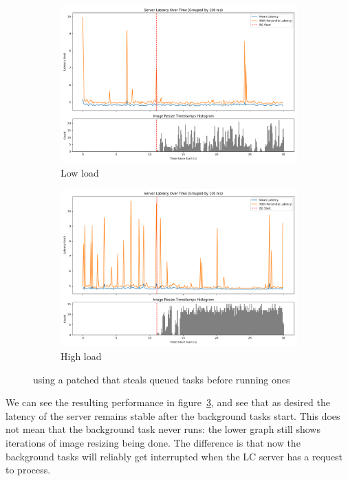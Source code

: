 \begin{figure}[t]
    \centering
    \begin{subfigure}[t]{0.49\columnwidth}
        \includegraphics[width=\columnwidth]{graphs/patched-idle-low-two.png}
        \caption{Low load}\label{fig:patched-idle-low-two}
    \end{subfigure}
    \hspace{\fill}
    \begin{subfigure}[t]{0.49\columnwidth}
        \includegraphics[width=\columnwidth]{graphs/patched-idle-high-two.png}
        \caption{High load}\label{fig:patched-idle-high-two}
    \end{subfigure}
    \vspace{4pt}
    \caption{using a patched \schedidle{} that steals queued \schednormal{}
    tasks before running \schedidle{} ones}\label{fig:patched-idle}
\end{figure}

We can see the resulting performance in figure~\ref{fig:patched-idle}, and see
that as desired the latency of the server remains stable after the background
tasks start. This does not mean that the background task never runs: the lower
graph still shows iterations of image resizing being done. The difference is
that now the background tasks will reliably get interrupted when the LC server
has a request to process.

